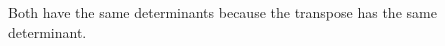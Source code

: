 \documentclass[main.tex]{subfiles}
\begin{document}
\begin{enumerate}
    Both have the same determinants because the transpose has the same determinant.

\end{enumerate}
\end{document}
